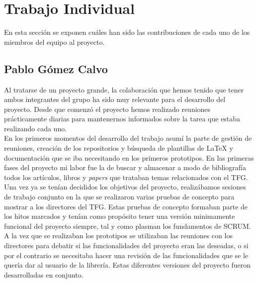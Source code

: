
\chapter{Trabajo Individual}
\label{cap7}
\label{cap:individual}

En esta secci\'on se exponen cu\'ales han sido las contribuciones de cada uno de los miembros del equipo al proyecto.\\



\section{Pablo G\'omez Calvo}

Al tratarse de un proyecto grande, la colaboraci\'on que hemos tenido que tener ambos integrantes del grupo ha sido muy relevante para el desarrollo del proyecto. Desde que comenz\'o el proyecto hemos realizado reuniones pr\'acticamente diarias para mantenernos informados sobre la tarea que estaba realizando cada uno. \\

En los primeros momentos del desarrollo del trabajo asum\'i la parte de gesti\'on de reuniones, creaci\'on de los repositorios y b\'usqueda de plantillas de LaTeX y documentaci\'on que se iba necesitando en los primeros prototipos. En las primeras fases del proyecto mi labor fue la de buscar y almacenar a modo de bibliograf\'ia todos los art\'iculos, libros y \textit{papers} que trataban temas relacionados con el TFG.\\

Una vez ya se ten\'ian decididos los objetivos del proyecto, realiz\'abamos sesiones de trabajo conjunto en la que se realizaron varias pruebas de concepto para mostrar a los directores del TFG. Estas pruebas de concepto formaban parte de los hitos marcados y ten\'ian como prop\'osito tener una versi\'on minimamente funcional del proyecto siempre, tal y como plasman los fundamentos de SCRUM.\\

A la vez que se realizaban los prototipos se utilizaban las reuniones con los directores para debatir si las funcionalidades del proyecto eran las deseadas, o si por el contrario se necesitaba hacer una revisi\'on de las funcionalidades que se le quer\'ia dar al usuario de la librer\'ia. Estas diferentes versiones del proyecto fueron desarrolladas en conjunto.\\

